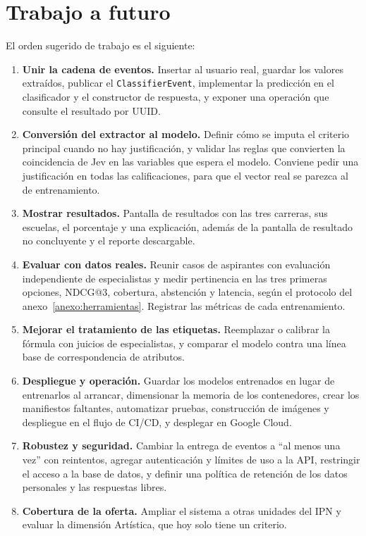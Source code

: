 \section*{Trabajo a futuro}
El orden sugerido de trabajo es el siguiente:
\begin{enumerate}
    \item \textbf{Unir la cadena de eventos.} Insertar al usuario real, guardar los valores extraídos, publicar el \texttt{ClassifierEvent}, implementar la predicción en el clasificador y el constructor de respuesta, y exponer una operación que consulte el resultado por UUID.
    \item \textbf{Conversión del extractor al modelo.} Definir cómo se imputa el criterio principal cuando no hay justificación, y validar las reglas que convierten la coincidencia de Jev en las variables que espera el modelo. Conviene pedir una justificación en todas las calificaciones, para que el vector real se parezca al de entrenamiento.
    \item \textbf{Mostrar resultados.} Pantalla de resultados con las tres carreras, sus escuelas, el porcentaje y una explicación, además de la pantalla de resultado no concluyente y el reporte descargable.
    \item \textbf{Evaluar con datos reales.} Reunir casos de aspirantes con evaluación independiente de especialistas y medir pertinencia en las tres primeras opciones, NDCG@3, cobertura, abstención y latencia, según el protocolo del anexo~\ref{anexo:herramientas}. Registrar las métricas de cada entrenamiento.
    \item \textbf{Mejorar el tratamiento de las etiquetas.} Reemplazar o calibrar la fórmula con juicios de especialistas, y comparar el modelo contra una línea base de correspondencia de atributos.
    \item \textbf{Despliegue y operación.} Guardar los modelos entrenados en lugar de entrenarlos al arrancar, dimensionar la memoria de los contenedores, crear los manifiestos faltantes, automatizar pruebas, construcción de imágenes y despliegue en el flujo de CI/CD, y desplegar en Google Cloud.
    \item \textbf{Robustez y seguridad.} Cambiar la entrega de eventos a ``al menos una vez'' con reintentos, agregar autenticación y límites de uso a la API, restringir el acceso a la base de datos, y definir una política de retención de los datos personales y las respuestas libres.
    \item \textbf{Cobertura de la oferta.} Ampliar el sistema a otras unidades del IPN y evaluar la dimensión Artística, que hoy solo tiene un criterio.
\end{enumerate}

\endinput

